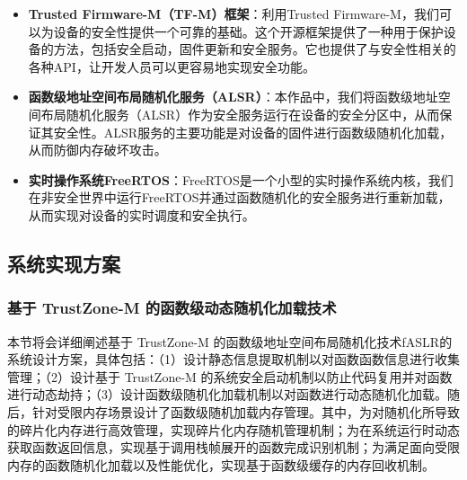 \documentclass[UTF8,12pt,a4paper]{ctexart}
\numberwithin{figure}{section}
\begin{document}
\begin{itemize}
    \item \textbf{Trusted Firmware-M（TF-M）框架}：利用Trusted Firmware-M，我们可以为设备的安全性提供一个可靠的基础。这个开源框架提供了一种用于保护设备的方法，包括安全启动，固件更新和安全服务。它也提供了与安全性相关的各种API，让开发人员可以更容易地实现安全功能。
    \item \textbf{函数级地址空间布局随机化服务（ALSR）}：本作品中，我们将函数级地址空间布局随机化服务（ALSR）作为安全服务运行在设备的安全分区中，从而保证其安全性。ALSR服务的主要功能是对设备的固件进行函数级随机化加载，从而防御内存破坏攻击。
    \item \textbf{实时操作系统FreeRTOS}：FreeRTOS是一个小型的实时操作系统内核，我们在非安全世界中运行FreeRTOS并通过函数随机化的安全服务进行重新加载，从而实现对设备的实时调度和安全执行。
\end{itemize}

\subsection{系统实现方案}

\subsubsection{基于 TrustZone-M 的函数级动态随机化加载技术}
\par 本节将会详细阐述基于 TrustZone-M 的函数级地址空间布局随机化技术fASLR的系统设计方案，具体包括：（1）设计静态信息提取机制以对函数函数信息进行收集管理；（2）设计基于 TrustZone-M 的系统安全启动机制以防止代码复用并对函数进行动态劫持；（3）设计函数级随机化加载机制以对函数进行动态随机化加载。随后，针对受限内存场景设计了函数级随机加载内存管理。其中，为对随机化所导致的碎片化内存进行高效管理，实现碎片化内存随机管理机制；为在系统运行时动态获取函数返回信息，实现基于调用栈帧展开的函数完成识别机制；为满足面向受限内存的函数随机化加载以及性能优化，实现基于函数级缓存的内存回收机制。
\end{document}
